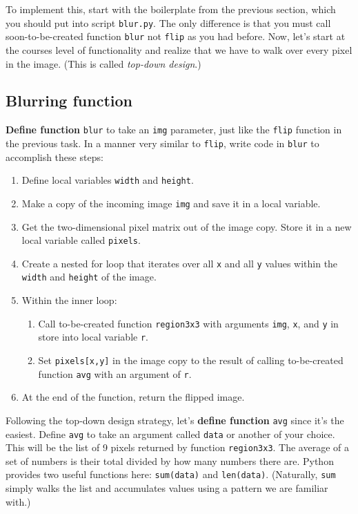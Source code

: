 To implement this, start with the boilerplate from the previous section, which you should put into script {\tt blur.py}. The only difference is that you must call soon-to-be-created function {\tt blur} not {\tt flip} as you had before. Now, let's start at the courses level of functionality and realize that we have to walk over every pixel in the image. (This is called {\em top-down design}.) 

\subsection{Blurring function}

{\bf Define function} {\tt blur} to take an {\tt img} parameter, just like the {\tt flip} function in the previous task.  In a manner very similar to {\tt flip}, write code in {\tt blur} to accomplish these steps:

\begin{enumerate}

\item Define local variables {\tt width} and {\tt height}.
\item Make a copy of the incoming image {\tt img} and save it in a local variable.
\item Get the two-dimensional pixel matrix out of the image copy. Store it in a new local variable called {\tt pixels}.
\item Create a nested for loop that iterates over all {\tt x} and all {\tt y} values within the {\tt width} and {\tt height} of the image.
\item Within the inner loop:
\begin{enumerate}
\item Call to-be-created function {\tt region3x3} with arguments {\tt img}, {\tt x}, and {\tt y} in store into local variable {\tt r}.
\item Set {\tt pixels[x,y]} in the image copy to the result of calling to-be-created function {\tt avg} with an argument of {\tt r}.
\end{enumerate}
\item At the end of the function, return the flipped image.
\end{enumerate} 

Following the top-down design strategy, let's {\bf define function} {\tt avg} since it's the easiest. Define {\tt avg} to take an argument called {\tt data} or another of your choice. This will be the list of 9 pixels returned by function {\tt region3x3}. The average of a set of numbers is their total divided by how many numbers there are. Python provides two useful functions here: {\tt sum(data)} and {\tt len(data)}.  (Naturally, {\tt sum} simply walks the list and accumulates values using a pattern we are familiar with.)

